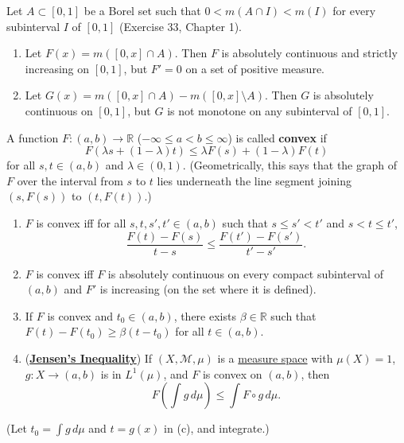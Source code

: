 	\begin{exercise}[Folland 3.41]
		Let $A \subset [0, 1]$ be a Borel set such that $0 < m(A \cap I) < m(I)$ for every subinterval $I$ of $[0, 1]$ (Exercise 33, Chapter 1).
		\begin{enumerate}[label=\textbf{\alph*.}]
			\item Let $F(x) = m([0, x] \cap A)$. Then $F$ is absolutely continuous and strictly increasing on $[0, 1]$, but $F' = 0$ on a set of positive measure.
			\item Let $G(x) = m([0, x] \cap A) - m([0, x] \setminus A)$. Then $G$ is absolutely continuous on $[0, 1]$, but $G$ is not monotone on any subinterval of $[0, 1]$.
		\end{enumerate}
	\end{exercise}
	\begin{solution}

	\end{solution}

	\begin{exercise}[Folland 3.42]
		A function $F : (a, b) \to \mathbb{R}$ ($-\infty \le a < b \le \infty$) is called \textbf{convex} if
		\begin{equation}
			F(\lambda s + (1 - \lambda)t) \le \lambda F(s) + (1 - \lambda)F(t)
		\end{equation}
		for all $s, t \in (a, b)$ and $\lambda \in (0, 1)$. (Geometrically, this says that the graph of $F$ over the interval from $s$ to $t$ lies underneath the line segment joining $(s, F(s))$ to $(t, F(t))$.)
		\begin{enumerate}[label=\textbf{\alph*.}]
			\item $F$ is convex iff for all $s, t, s', t' \in (a, b)$ such that $s \le s' < t'$ and $s < t \le t'$,
			\begin{equation}
				\frac{F(t) - F(s)}{t - s} \le \frac{F(t') - F(s')}{t' - s'}.
			\end{equation}
			\item $F$ is convex iff $F$ is absolutely continuous on every compact subinterval of $(a, b)$ and $F'$ is increasing (on the set where it is defined).
			\item If $F$ is convex and $t_0 \in (a, b)$, there exists $\beta \in \mathbb{R}$ such that $F(t) - F(t_0) \ge \beta(t - t_0)$ for all $t \in (a, b)$.
			\item (\textbf{\hyperref[thm:jensens-inequality]{Jensen's Inequality}}) If $(X, \mathcal{M}, \mu)$ is a \hyperref[def:measure-space]{measure space} with $\mu(X) = 1$, $g : X \to (a, b)$ is in $L^1(\mu)$, and $F$ is convex on $(a, b)$, then
			\begin{equation}
				F\left(\int g \, d\mu\right) \le \int F \circ g \, d\mu.
			\end{equation}
		\end{enumerate}
		(Let $t_0 = \int g \, d\mu$ and $t = g(x)$ in (c), and integrate.)
	\end{exercise}
	\begin{solution}

	\end{solution}


